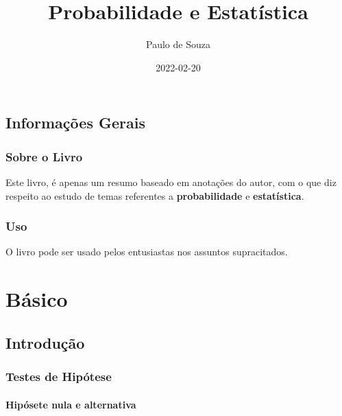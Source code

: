 \documentclass[
]{book}
\title{Probabilidade e Estatística}
\author{Paulo de Souza}
\date{2022-02-20}
\begin{document}
\maketitle

{
\setcounter{tocdepth}{1}
\tableofcontents
}
\hypertarget{informauxe7uxf5es-gerais}{%
\chapter*{Informações Gerais}\label{informauxe7uxf5es-gerais}}

\hypertarget{sobre-o-livro}{%
\section*{Sobre o Livro}\label{sobre-o-livro}}

Este livro, é apenas um resumo baseado em anotações do autor, com o que diz respeito ao estudo de temas referentes a \textbf{probabilidade} e \textbf{estatística}.

\hypertarget{uso}{%
\section*{Uso}\label{uso}}

O livro pode ser usado pelos entusiastas nos assuntos supracitados.

\hypertarget{part-buxe1sico}{%
\part{Básico}\label{part-buxe1sico}}

\hypertarget{introduuxe7uxe3o}{%
\chapter{Introdução}\label{introduuxe7uxe3o}}

\hypertarget{testes-de-hipuxf3tese}{%
\section{Testes de Hipótese}\label{testes-de-hipuxf3tese}}

\hypertarget{hipuxf3sete-nula-e-alternativa}{%
\subsection{Hipósete nula e alternativa}\label{hipuxf3sete-nula-e-alternativa}}
\end{document}
